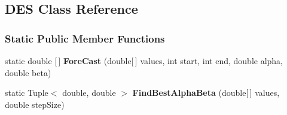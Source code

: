 \hypertarget{classSmoothing_1_1DES}{}\subsection{D\+ES Class Reference}
\label{classSmoothing_1_1DES}
\subsubsection*{Static Public Member Functions}
\begin{DoxyCompactItemize}
\item 
\mbox{\label{classSmoothing_1_1DES_a0070a0fe64183f11565c65c77ff6d96e}} 
static double \mbox{[}$\,$\mbox{]} {\bfseries Fore\+Cast} (double\mbox{[}$\,$\mbox{]} values, int start, int end, double alpha, double beta)
\item 
\mbox{\label{classSmoothing_1_1DES_a8d213ff00da8d96a12f41f8c965f0eb1}} 
static Tuple$<$ double, double $>$ {\bfseries Find\+Best\+Alpha\+Beta} (double\mbox{[}$\,$\mbox{]} values, double step\+Size)
\end{DoxyCompactItemize}
